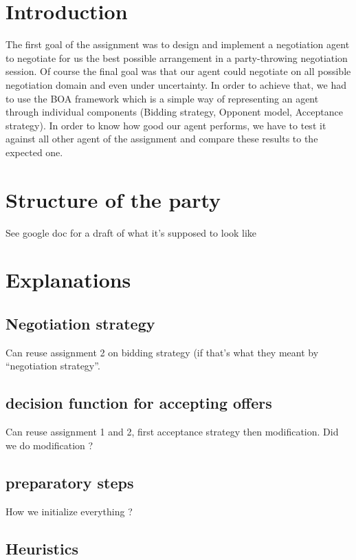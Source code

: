 \section{Introduction}

The first goal of the assignment was to design and implement a negotiation agent to negotiate for us the best possible arrangement in a party-throwing negotiation session. Of course the final goal was that our agent could negotiate on all possible negotiation domain and even under uncertainty. In order to achieve that, we had to use the BOA framework which is a simple way of representing an agent through individual components (Bidding strategy, Opponent model, Acceptance strategy). In order to know how good our agent performs, we have to test it against all other agent of the assignment and compare these results to the expected one.

\section{Structure of the party}

See google doc for a draft of what it's supposed to look like

\section{Explanations}

\subsection{Negotiation strategy}

Can reuse assignment 2 on bidding strategy (if that's what they meant by ``negotiation strategy''. 

\subsection{decision function for accepting offers}

Can reuse assignment 1 and 2, first acceptance strategy then modification. Did we do modification ?

\subsection{preparatory steps}

How we initialize everything ?

\subsection{Heuristics}

